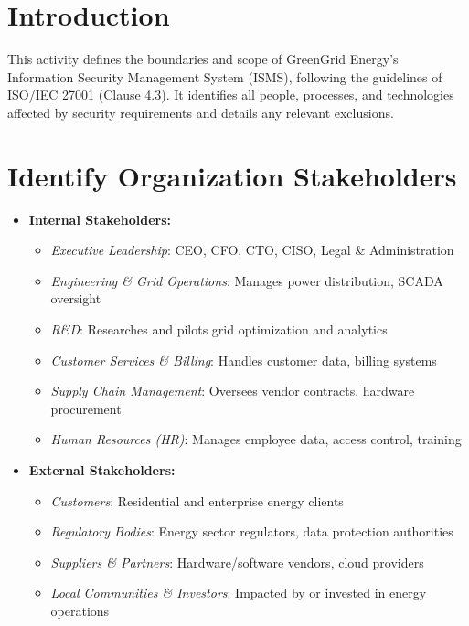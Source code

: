 

\section{Introduction}
This activity defines the boundaries and scope of GreenGrid Energy’s Information Security Management System (ISMS), following the guidelines of ISO/IEC 27001 (Clause 4.3). It identifies all people, processes, and technologies affected by security requirements and details any relevant exclusions.

\section{Identify Organization Stakeholders}
\begin{itemize}
    \item \textbf{Internal Stakeholders:}
    \begin{itemize}
        \item \textit{Executive Leadership}: CEO, CFO, CTO, CISO, Legal \& Administration
        \item \textit{Engineering \& Grid Operations}: Manages power distribution, SCADA oversight
        \item \textit{R\&D}: Researches and pilots grid optimization and analytics
        \item \textit{Customer Services \& Billing}: Handles customer data, billing systems
        \item \textit{Supply Chain Management}: Oversees vendor contracts, hardware procurement
        \item \textit{Human Resources (HR)}: Manages employee data, access control, training
    \end{itemize}
    \item \textbf{External Stakeholders:}
    \begin{itemize}
        \item \textit{Customers}: Residential and enterprise energy clients
        \item \textit{Regulatory Bodies}: Energy sector regulators, data protection authorities
        \item \textit{Suppliers \& Partners}: Hardware/software vendors, cloud providers
        \item \textit{Local Communities \& Investors}: Impacted by or invested in energy operations
    \end{itemize}
\end{itemize}

